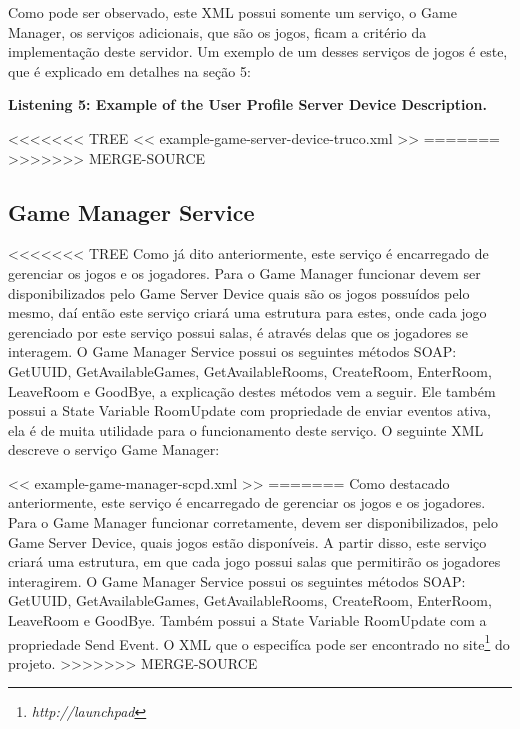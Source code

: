 \documentclass[a4paper]{sbgames}               %
\begin{document}
Como pode ser observado, este XML possui somente um serviço, o Game Manager, os serviços adicionais, que são os jogos, ficam a critério da implementação deste servidor. Um exemplo de um desses serviços de jogos é este, que é explicado em detalhes na seção 5:



\vspace{-2mm}
\scriptsize
\textbf{Listening 5: Example of the User Profile Server Device Description.}
\normalsize

<<<<<<< TREE
<< example-game-server-device-truco.xml >>
=======
>>>>>>> MERGE-SOURCE
\subsection{Game Manager Service}
<<<<<<< TREE
Como já dito anteriormente, este serviço é encarregado de gerenciar os jogos e os jogadores. Para o Game Manager funcionar devem ser disponibilizados pelo Game Server Device quais são os jogos possuídos pelo mesmo, daí então este serviço criará uma estrutura para estes, onde cada jogo gerenciado por este serviço possui salas, é através delas que os jogadores se interagem.
O Game Manager Service possui os seguintes métodos SOAP: GetUUID, GetAvailableGames, GetAvailableRooms, CreateRoom, EnterRoom, LeaveRoom e GoodBye, a explicação destes métodos vem a seguir. Ele também possui a State Variable RoomUpdate com propriedade de enviar eventos ativa, ela é de muita utilidade para o funcionamento deste serviço.
O seguinte XML descreve o serviço Game Manager:

<< example-game-manager-scpd.xml >>
=======
Como destacado anteriormente, este serviço é encarregado de gerenciar os jogos e os jogadores. Para o Game Manager funcionar corretamente, devem ser disponibilizados, pelo Game Server Device, quais jogos estão disponíveis. A partir disso, este serviço criará uma estrutura, em que cada jogo possui salas que permitirão os jogadores interagirem.
O Game Manager Service possui os seguintes métodos SOAP: GetUUID, GetAvailableGames, GetAvailableRooms, CreateRoom, EnterRoom, LeaveRoom e GoodBye. Também possui a State Variable RoomUpdate com a propriedade Send Event.
O XML que o especifíca pode ser encontrado no site\footnote{\textit{http://launchpad}} do projeto.
>>>>>>> MERGE-SOURCE
\end{document}
